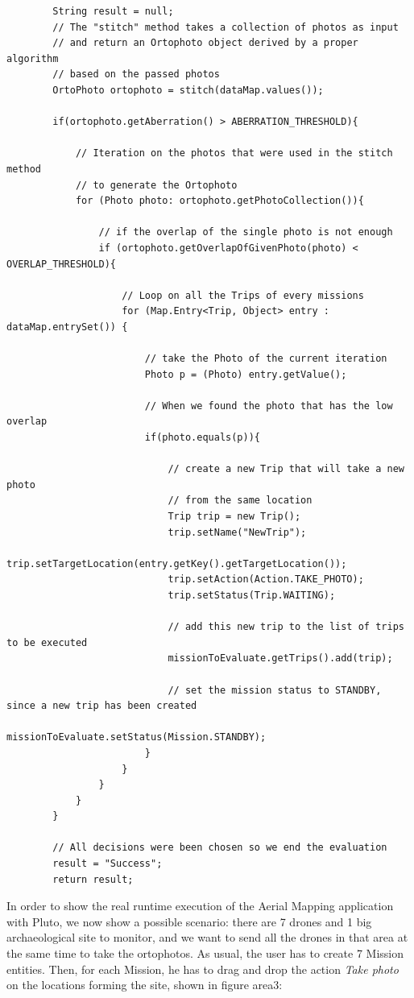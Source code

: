 \begin{lstlisting}
		String result = null;
		// The "stitch" method takes a collection of photos as input
        // and return an Ortophoto object derived by a proper algorithm
        // based on the passed photos
		OrtoPhoto ortophoto = stitch(dataMap.values());
		
		if(ortophoto.getAberration() > ABERRATION_THRESHOLD){
			
			// Iteration on the photos that were used in the stitch method
            // to generate the Ortophoto
			for (Photo photo: ortophoto.getPhotoCollection()){
				
				// if the overlap of the single photo is not enough
				if (ortophoto.getOverlapOfGivenPhoto(photo) < OVERLAP_THRESHOLD){
					
					// Loop on all the Trips of every missions
					for (Map.Entry<Trip, Object> entry : dataMap.entrySet()) {
						
						// take the Photo of the current iteration
						Photo p = (Photo) entry.getValue();
						
						// When we found the photo that has the low overlap
						if(photo.equals(p)){
							
							// create a new Trip that will take a new photo
                            // from the same location
							Trip trip = new Trip();
							trip.setName("NewTrip");
							trip.setTargetLocation(entry.getKey().getTargetLocation());
							trip.setAction(Action.TAKE_PHOTO);
							trip.setStatus(Trip.WAITING);

							// add this new trip to the list of trips to be executed
							missionToEvaluate.getTrips().add(trip);
							
							// set the mission status to STANDBY, since a new trip has been created
							missionToEvaluate.setStatus(Mission.STANDBY);
						}
					}		
				}
			}
		}
        
        // All decisions were been chosen so we end the evaluation
		result = "Success";
		return result;
\end{lstlisting}

In order to show the real runtime execution of the Aerial Mapping application with Pluto, we now show a possible scenario:
there are 7 drones and 1 big archaeological site to monitor, and we want to send all the drones in that area at the same time to take the ortophotos.
As usual, the user has to create 7 Mission entities.
Then, for each Mission, he has to drag and drop the action \textit{Take photo} on the locations forming the site, shown in figure area3:

